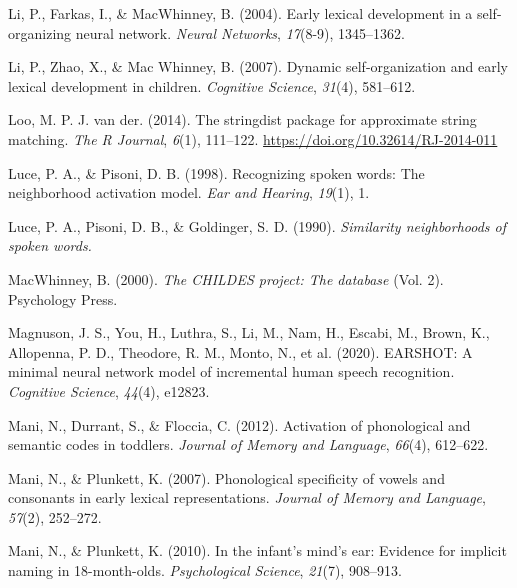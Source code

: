 \documentclass[
  12pt,
  b5paperpaper,
  twoside]{scrreprt}
\newlength{\cslhangindent}
\newlength{\cslentryspacingunit} %
\newenvironment{CSLReferences}[2] %
 {%
  \setlength{\parindent}{0pt}
  \ifodd #1
  \let\oldpar\par
  \def\par{\hangindent=\cslhangindent\oldpar}
  \fi
  \setlength{\parskip}{#2\cslentryspacingunit}
 }%
 {}
\begin{document}
\begin{CSLReferences}{1}{0}
\leavevmode{}%
Li, P., Farkas, I., \& MacWhinney, B. (2004). Early lexical development
in a self-organizing neural network. \emph{Neural Networks},
\emph{17}(8-9), 1345--1362.

\leavevmode{}%
Li, P., Zhao, X., \& Mac Whinney, B. (2007). Dynamic self-organization
and early lexical development in children. \emph{Cognitive Science},
\emph{31}(4), 581--612.

\leavevmode{}%
Loo, M. P. J. van der. (2014). The stringdist package for approximate
string matching. \emph{The R Journal}, \emph{6}(1), 111--122.
\url{https://doi.org/10.32614/RJ-2014-011}

\leavevmode{}%
Luce, P. A., \& Pisoni, D. B. (1998). Recognizing spoken words: The
neighborhood activation model. \emph{Ear and Hearing}, \emph{19}(1), 1.

\leavevmode{}%
Luce, P. A., Pisoni, D. B., \& Goldinger, S. D. (1990). \emph{Similarity
neighborhoods of spoken words.}

\leavevmode{}%
MacWhinney, B. (2000). \emph{The {CHILDES} project: The database} (Vol.
2). Psychology Press.

\leavevmode{}%
Magnuson, J. S., You, H., Luthra, S., Li, M., Nam, H., Escabi, M.,
Brown, K., Allopenna, P. D., Theodore, R. M., Monto, N., et al. (2020).
EARSHOT: A minimal neural network model of incremental human speech
recognition. \emph{Cognitive Science}, \emph{44}(4), e12823.

\leavevmode{}%
Mani, N., Durrant, S., \& Floccia, C. (2012). Activation of phonological
and semantic codes in toddlers. \emph{Journal of Memory and Language},
\emph{66}(4), 612--622.

\leavevmode{}%
Mani, N., \& Plunkett, K. (2007). Phonological specificity of vowels and
consonants in early lexical representations. \emph{Journal of Memory and
Language}, \emph{57}(2), 252--272.

\leavevmode{}%
Mani, N., \& Plunkett, K. (2010). In the infant's mind's ear: Evidence
for implicit naming in 18-month-olds. \emph{Psychological Science},
\emph{21}(7), 908--913.


\end{CSLReferences}
\end{document}
